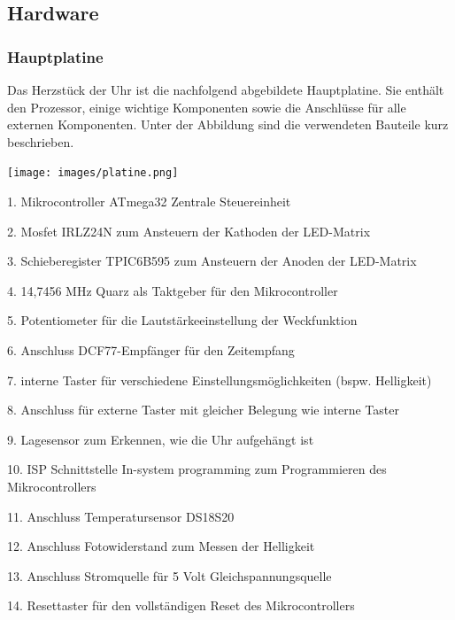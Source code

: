 \subsection{Hardware}
\subsubsection{Hauptplatine}
Das Herzstück der Uhr ist die nachfolgend abgebildete Hauptplatine. Sie enthält den Prozessor, einige wichtige Komponenten sowie die Anschlüsse für alle externen Komponenten. Unter der Abbildung sind die verwendeten Bauteile kurz beschrieben.

\begin{center}
\texttt{[image: images/platine.png]}
\label{img_platine}
\end{center}

\begin{list}{}
{\setlength{\topsep}{0cm}
\setlength{\itemsep}{0.2cm}
\setlength{\leftmargin}{3cm}
\setlength{\labelwidth}{3cm}
\setlength{\labelsep}{0cm}
\renewcommand{\makelabel}[1]{\textbf{\textsf{\normalsize #1} }}}
\item[1. Mikrocontroller ATmega32] Zentrale Steuereinheit
\item[2. Mosfet IRLZ24N] zum Ansteuern der Kathoden der LED-Matrix
\item[3. Schieberegister TPIC6B595] zum Ansteuern der Anoden der LED-Matrix 
\item[4. 14,7456 MHz Quarz] als Taktgeber für den Mikrocontroller
\item[5. Potentiometer] für die Lautstärkeeinstellung der Weckfunktion
\item[6. Anschluss DCF77-Empfänger] für den Zeitempfang
\item[7. interne Taster] für verschiedene Einstellungsmöglichkeiten (bspw. Helligkeit)
\item[8. Anschluss für externe Taster] mit gleicher Belegung wie interne Taster
\item[9. Lagesensor] zum Erkennen, wie die Uhr aufgehängt ist
\item[10. ISP Schnittstelle] In-system programming zum Programmieren des Mikrocontrollers
\item[11. Anschluss Temperatursensor DS18S20] 
\item[12. Anschluss Fotowiderstand] zum Messen der Helligkeit
\item[13. Anschluss Stromquelle] für 5 Volt Gleichspannungsquelle
\item[14. Resettaster] für den vollständigen Reset des Mikrocontrollers
\end{list}


%
%
%

